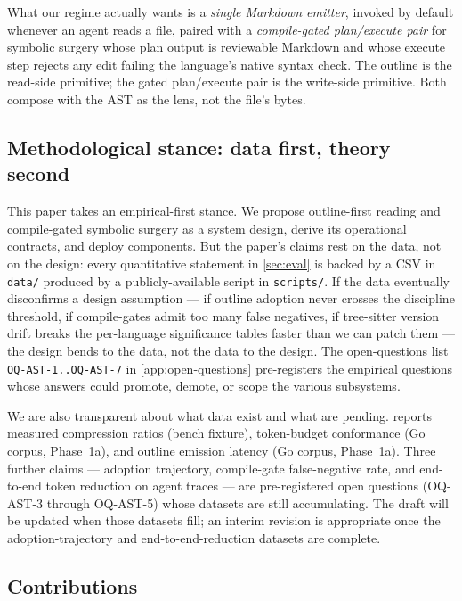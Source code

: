 What our regime actually wants is a \emph{single Markdown emitter},
invoked by default whenever an agent reads a file, paired with a
\emph{compile-gated plan/execute pair} for symbolic surgery whose
plan output is reviewable Markdown and whose execute step rejects any
edit failing the language's native syntax check. The outline is the
read-side primitive; the gated plan/execute pair is the write-side
primitive. Both compose with the AST as the lens, not the file's
bytes.

\subsection{Methodological stance: data first, theory second}
\label{sec:stance}

This paper takes an empirical-first stance. We propose outline-first
reading and compile-gated symbolic surgery as a system design, derive
its operational contracts, and deploy components. But the paper's
claims rest on the data, not on the design: every quantitative
statement in \cref{sec:eval} is backed by a CSV in \texttt{data/}
produced by a publicly-available script in \texttt{scripts/}. If the
data eventually disconfirms a design assumption --- if outline
adoption never crosses the discipline threshold, if compile-gates
admit too many false negatives, if tree-sitter version drift breaks
the per-language significance tables faster than we can patch them
--- the design bends to the data, not the data to the design. The
open-questions list \texttt{OQ-AST-1..OQ-AST-7} in
\cref{app:open-questions} pre-registers the empirical questions whose
answers could promote, demote, or scope the various subsystems.

We are also transparent about what data exist and what are pending.
 reports measured compression ratios (bench fixture),
token-budget conformance (Go corpus, Phase~1a), and outline emission
latency (Go corpus, Phase~1a). Three further claims --- adoption
trajectory, compile-gate false-negative rate, and end-to-end token
reduction on agent traces --- are pre-registered open questions
(OQ-AST-3 through OQ-AST-5) whose datasets are still accumulating.
The draft will be updated when those datasets fill; an interim
revision is appropriate once the adoption-trajectory and
end-to-end-reduction datasets are complete.

\subsection{Contributions}

